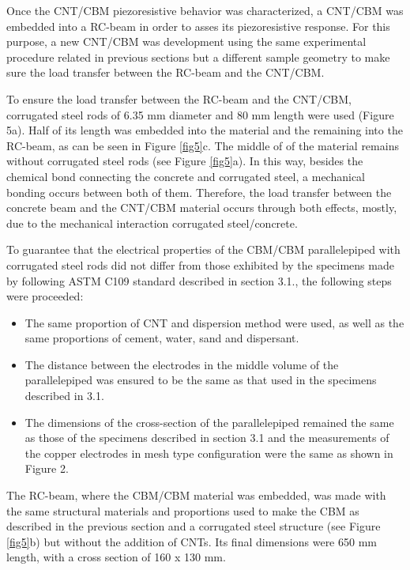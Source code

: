 \documentclass[twocolumn]{bmcart}%
\begin{document}
Once  the CNT/CBM piezoresistive behavior  was characterized, a CNT/CBM was embedded into a RC-beam in order to asses its piezoresistive response. For this purpose, a  new CNT/CBM was development using the same experimental procedure related in previous sections but a different sample geometry to make sure the load transfer between the RC-beam and the CNT/CBM.

To ensure the load transfer between the RC-beam and the CNT/CBM, corrugated steel rods of 6.35 mm diameter and 80 mm length were used (Figure 5a). Half of its length  was embedded into the material and the remaining into the RC-beam, as can be seen in Figure \ref{fig5}c. The middle of of the material remains without corrugated steel rods (see Figure \ref{fig5}a). In this way, besides the chemical bond connecting the concrete and corrugated steel, a mechanical bonding occurs between both of them. Therefore, the load transfer between the concrete beam and the CNT/CBM material occurs through both effects, mostly, due to the mechanical interaction corrugated steel/concrete.

To guarantee that the electrical properties of the CBM/CBM parallelepiped with corrugated steel rods did not differ from those exhibited by the specimens made by following ASTM C109 standard \cite{ASTMC1092000} described in section 3.1., the following steps were proceeded:

\begin{itemize}
\item The same proportion of CNT and dispersion method were used, as well as the same proportions of cement, water, sand and dispersant.

\item The distance between the electrodes in the middle volume of the parallelepiped was ensured to be the same as that used in the specimens described in 3.1.

\item The dimensions of the cross-section of the parallelepiped remained the same as those of the specimens described in section 3.1 and the measurements of the copper electrodes in mesh type configuration were the same as shown in Figure 2. 
\end{itemize}

The RC-beam, where the CBM/CBM material was embedded, was made with the same structural materials and proportions used to make the CBM as described in the previous section and a corrugated steel structure (see Figure \ref{fig5}b) but without the addition of CNTs. Its final dimensions were 650 mm length, with a cross section of 160 x 130 mm.
\end{document}
